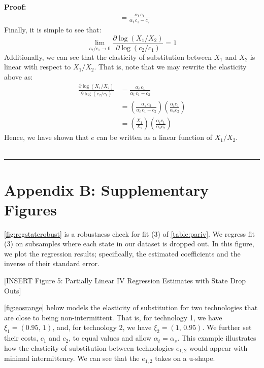 \documentclass[11pt,a4paper,leqno]{extarticle}
\newenvironment{proof}[1][Proof]{\noindent\textbf{#1:} }{\ \rule{0.5em}{0.5em}}
\begin{document}
\begin{proof}
\begin{align*}
		&= 
		\frac{\alpha _{t}\,c_{1} }{\alpha _{t}\,c_{1} - c_2}
		\end{align*}
		Finally, it is simple to see that:
		$$ \lim_{c_2/c_1 \to 0} \frac{\partial \log(X_1/X_2)}{\partial \log(c_2/c_1)} = 1$$
		Additionally, we can see that the elasticity of substitution between $X_1$ and $X_2$ is linear with respect to $X_1/X_2$. That is, note that we may rewrite the elasticity above as:
		\begin{align*}
		\frac{\partial \log(X_1/X_2)}{\partial \log(c_2/c_1)} &= \frac{\alpha _{t}\,c_{1} }{\alpha _{t}\,c_{1} - c_2}\\
		&= \left( \frac{\alpha _{s}\,c_{2} }{\alpha _{t}\,c_{1} - c_2} \right) \left( \frac{ \alpha_t c_1 }{ \alpha_s c_2 } \right)\\
		&= \left( \frac{X_1}{X_2} \right) \left( \frac{ \alpha_t c_1  }{\alpha_s c_2 } \right)
		\end{align*}
		Hence, we have shown that $e$ can be written as a linear function of $X_1/X_2$. 
		\\ \hfill
	\end{proof}
	
	
	\pagebreak
	
	
	
	
	
	\section{Appendix B: Supplementary Figures}
	\label{sec:AppendixB}
	
	\autoref{fig:regstaterobust} is a robustness check for fit (3) of \autoref{table:pariv}. We regress fit (3) on subsamples where each state in our dataset is dropped out. In this figure, we plot the regression results; specifically, the estimated coefficients and the inverse of their standard error. 
	
	\vspace{0.15in}
	\begin{center}
		[INSERT Figure 5: Partially Linear IV Regression Estimates with State Drop Outs]
	\end{center}
	\vspace{0.15in}
	
	
	\autoref{fig:eosrange} below models the elasticity of substitution for two technologies that are close to being non-intermittent. That is, for technology 1, we have $\xi_1 = (0.95,\, 1)$, and, for technology 2, we have $\xi_2 = (1, \,0.95)$. We further set their costs, $c_1$ and $c_2$, to equal values and allow $\alpha_t = \alpha_s$. This example illustrates how the elasticity of substitution between technologies $e_{1,2}$ would appear with minimal intermittency. We can see that the $e_{1,2}$ takes on a u-shape. 
	
\end{document}
